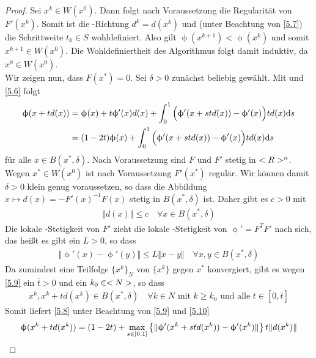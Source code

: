 \begin{proof}
	Sei $x^k\in W(x^0)$. Dann folgt nach Voraussetzung die Regularität von $F'(x^k)$. Somit ist die -Richtung $d^k=d(x^k)$ und (unter Beachtung von \cref{5.7}) die Schrittweite $t_k\in S$ wohldefiniert. Also gilt $\upphi(x^{k+1})<\upphi(x^k)$ und somit $x^{k+1}\in W(x^0)$. Die Wohldefiniertheit des Algorithmus folgt damit induktiv, da $x^0\in W(x^0)$. \\
	Wir zeigen nun, dass $F(x^\ast)=0$. Sei $\delta>0$ zunächst beliebig gewählt. Mit  und \cref{5.6} folgt
	\begin{align}
		\label{5.8}
		\begin{split}
			\upphi(x+td(x)) &= \upphi(x) + t\upphi'(x)d(x) + \int_0^1 \Big(\upphi'(x+std(x)) - \upphi'(x)\Big)td(x)\mathrm{d} s \\
			&= (1-2t)\upphi(x) + \int_0^1 \Big(\upphi'(x+std(x)) - \upphi'(x)\Big)td(x)\mathrm{d} s
		\end{split}
	\end{align}
	für alle $x\in B(x^\ast,\delta)$. Nach Voraussetzung sind $F$ und $F'$ stetig in $<R>^n$. Wegen $x^\ast\in W(x^0)$ ist nach Voraussetzung $F'(x^\ast)$ regulär. Wir können damit $\delta>0$ klein genug voraussetzen, so dass die Abbildung $x\mapsto d(x)=-F'(x)^{-1}F(x)$ stetig in $B(x^\ast,\delta)$ ist. Daher gibt es $c>0$ mit 
	\begin{align}
		\label{5.9}
		\Vert d(x)\Vert \le c\quad\forall x\in B(x^\ast,\delta)
	\end{align}
	Die lokale -Stetigkeit von $F'$ zieht die lokale -Stetigkeit von $\upphi'=F^TF'$ nach sich, das heißt es gibt ein $L>0$, so dass
	\begin{align}
		\label{5.10}
		\Vert \upphi'(x) - \upphi'(y)\Vert \le L\Vert x-y\Vert\quad\forall x,y\in B(x^\ast,\delta)
	\end{align}
	Da zumindest eine Teilfolge $\{x^k\}_N$ von $\{x^k\}$ gegen $x^\ast$ konvergiert, gibt es wegen \cref{5.9} ein $\overline{t}>0$ und ein $k_0\in<N>$, so dass
	\begin{align}
		\label{5.11}
		x^k, x^k+td(x^k)\in B(x^\ast,\delta)\quad\forall k\in N\text{ mit } k\ge k_0\text{ und alle } t\in [0,\overline{t}] 
	\end{align}
	Somit liefert \cref{5.8} unter Beachtung von \cref{5.9} und \cref{5.10}
	\begin{align}
		\upphi(x^k+td(x^k)) &= (1-2t) + \max\limits_{s\in [0,1]}\left\lbrace \Vert \upphi'(x^k+std(x^k)) - \upphi'(x^k)\Vert \right\rbrace t\Vert d(x^k)\Vert \notag\\

\end{align}
\end{proof}
